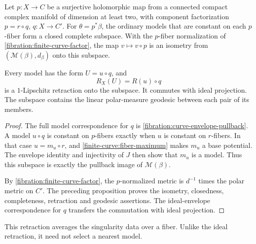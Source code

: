\begin{corollary}\label{finite-curve:original-base-subspace}
Let $p:X\to C$ be a surjective holomorphic map from a connected
compact complex manifold of dimension at least two, with
component factorization $p=r\circ q$, $q:X\to C'$.
For $\theta=p^*\beta$, the ordinary models that are constant
on each $p$-fiber form a closed complete subspace. With the
$p$-fiber normalization of \cref{fibration:finite-curve-factor},
the map $v\mapsto v\circ p$ is an isometry from
$(\mathcal M(\beta),d_\beta)$ onto this subspace.

Every model has the form $U=u\circ q$, and
\[
 R_X(U)=R(u)\circ q
\]
is a $1$-Lipschitz retraction onto the subspace. It commutes
with ideal projection. The subspace contains the linear
polar-measure geodesic between each pair of its members.
\end{corollary}
\begin{proof}
The full model correspondence for $q$ is
\cref{fibration:curve-envelope-pullback}. A model $u\circ q$
is constant on $p$-fibers exactly when $u$ is constant on
$r$-fibers. In that case $u=m_u\circ r$, and
\cref{finite-curve:fiber-maximum} makes $m_u$ a base potential.
The envelope identity and injectivity of $J$ then show that
$m_u$ is a model. Thus this subspace is exactly the pullback
image of $\mathcal M(\beta)$.

By \cref{fibration:finite-curve-factor}, the $p$-normalized
metric is $d^{-1}$ times the polar metric on $C'$.
The preceding proposition proves the isometry, closedness,
completeness, retraction and geodesic assertions.
The ideal-envelope correspondence for $q$ transfers the
commutation with ideal projection.
\end{proof}

This retraction averages the singularity data over a fiber.
Unlike the ideal retraction, it need not select a nearest model.

